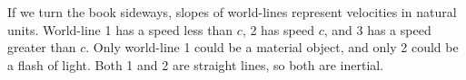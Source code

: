 If we turn the book sideways, slopes of world-lines represent velocities
in natural units. World-line 1 has a speed less than $c$, 2 has speed $c$,
and 3 has a speed greater than $c$. Only world-line 1 could be a material object,
and only 2 could be a flash of light. Both 1 and 2 are straight lines, so both
are inertial.

